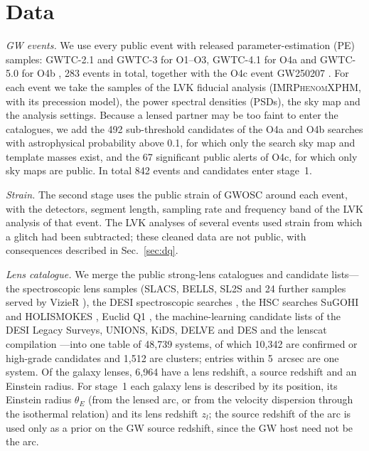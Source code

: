 \section{Data}
\label{sec:data}
\emph{GW events.} We use every public event with released parameter-estimation (PE) samples: GWTC-2.1 and GWTC-3 for O1--O3, GWTC-4.1 for O4a and GWTC-5.0 for O4b \citep{lvk2024gwtc21,lvk2023gwtc3,lvk2025gwtc4,lvk2026gwtc5}, 283 events in total, together with the O4c event GW250207 \citep{lvk2026gw250207}. For each event we take the samples of the LVK fiducial analysis (\textsc{IMRPhenomXPHM}, with its precession model), the power spectral densities (PSDs), the sky map and the analysis settings. Because a lensed partner may be too faint to enter the catalogues, we add the 492 sub-threshold candidates of the O4a and O4b searches with astrophysical probability above 0.1, for which only the search sky map and template masses exist, and the 67 significant public alerts of O4c, for which only sky maps are public. In total 842 events and candidates enter stage~1.

\emph{Strain.} The second stage uses the public strain of GWOSC \citep{gwosc2023} around each event, with the detectors, segment length, sampling rate and frequency band of the LVK analysis of that event. The LVK analyses of several events used strain from which a glitch had been subtracted; these cleaned data are not public, with consequences described in Sec.~\ref{sec:dq}.

\emph{Lens catalogue.} We merge the public strong-lens catalogues and candidate lists---the spectroscopic lens samples (SLACS, BELLS, SL2S and 24 further samples served by VizieR \citep{bolton2008slacs,brownstein2012bells}), the DESI spectroscopic searches \citep{hsu2026desipairs,karp2026desisfl}, the HSC searches SuGOHI and HOLISMOKES \citep{sonnenfeld2018sugohi,schuldt2025holismokes16}, Euclid Q1 \citep{euclid2025q1lenses}, the machine-learning candidate lists of the DESI Legacy Surveys, UNIONS, KiDS, DELVE and DES \citep{huang2021desi,stein2022mining,storfer2024desi,inchausti2025desi,storfer2025glue,grespan2024teglie,zaborowski2023delve,gonzalez2025des} and the lenscat compilation \citep{vujeva2024lenscat}---into one table of 48,739 systems, of which 10,342 are confirmed or high-grade candidates and 1,512 are clusters; entries within 5~arcsec are one system. Of the galaxy lenses, 6,964 have a lens redshift, a source redshift and an Einstein radius. For stage~1 each galaxy lens is described by its position, its Einstein radius $\theta_E$ (from the lensed arc, or from the velocity dispersion through the isothermal relation) and its lens redshift $z_l$; the source redshift of the arc is used only as a prior on the GW source redshift, since the GW host need not be the arc.

